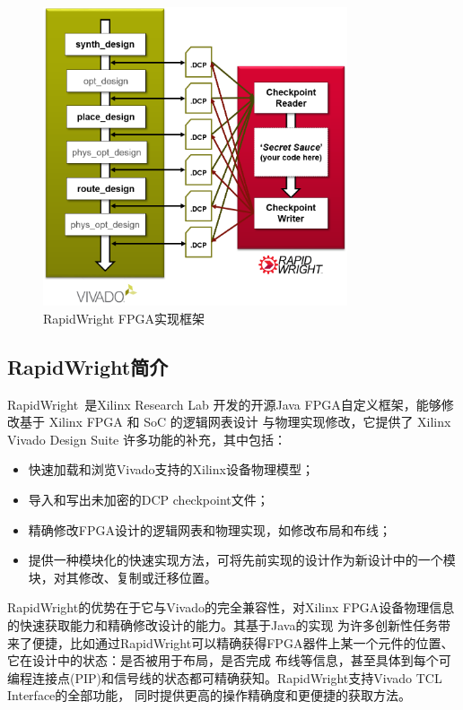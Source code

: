\begin{figure}[h]
	\centering
	\includegraphics[width=0.8\textwidth]{figure/vivado_dcps}
	\caption{RapidWright FPGA实现框架~\cite{lavin2018rapidwright}} 
	\label{fig:rapidwright}
\end{figure}

\subsection{RapidWright简介}

RapidWright~\cite{lavin2018rapidwright}是Xilinx Research Lab 开发的开源Java FPGA自定义框架，能够修改基于 Xilinx FPGA 和 SoC 的逻辑网表设计
与物理实现修改，它提供了 Xilinx Vivado Design Suite 许多功能的补充，其中包括：
\begin{itemize}
    \item 快速加载和浏览Vivado支持的Xilinx设备物理模型；
    \item 导入和写出未加密的DCP checkpoint文件；
    \item 精确修改FPGA设计的逻辑网表和物理实现，如修改布局和布线；
    \item 提供一种模块化的快速实现方法，可将先前实现的设计作为新设计中的一个模块，对其修改、复制或迁移位置。
\end{itemize}

RapidWright的优势在于它与Vivado的完全兼容性，对Xilinx FPGA设备物理信息的快速获取能力和精确修改设计的能力。其基于Java的实现
为许多创新性任务带来了便捷，比如通过RapidWright可以精确获得FPGA器件上某一个元件的位置、它在设计中的状态：是否被用于布局，是否完成
布线等信息，甚至具体到每个可编程连接点(PIP)和信号线的状态都可精确获知。RapidWright支持Vivado TCL Interface的全部功能，
同时提供更高的操作精确度和更便捷的获取方法。


